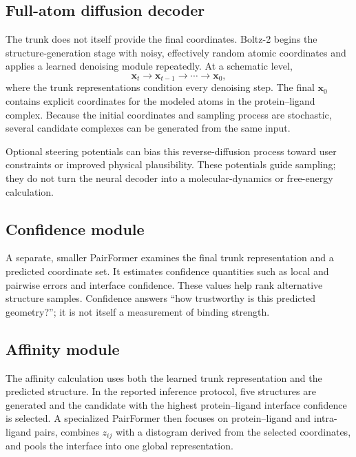 \subsection{Full-atom diffusion decoder}

The trunk does not itself provide the final coordinates. Boltz-2 begins the
structure-generation stage with noisy, effectively random atomic coordinates
and applies a learned denoising module repeatedly. At a schematic level,
\[
  \mathbf{x}_{t}
  \longrightarrow
  \mathbf{x}_{t-1}
  \longrightarrow \cdots \longrightarrow
  \mathbf{x}_{0},
\]
where the trunk representations condition every denoising step. The final
$\mathbf{x}_0$ contains explicit coordinates for the modeled atoms in the
protein--ligand complex. Because the initial coordinates and sampling process
are stochastic, several candidate complexes can be generated from the same
input.

Optional steering potentials can bias this reverse-diffusion process toward
user constraints or improved physical plausibility. These potentials guide
sampling; they do not turn the neural decoder into a molecular-dynamics or
free-energy calculation.

\subsection{Confidence module}

A separate, smaller PairFormer examines the final trunk representation and a
predicted coordinate set. It estimates confidence quantities such as local and
pairwise errors and interface confidence. These values help rank alternative
structure samples. Confidence answers ``how trustworthy is this predicted
geometry?''; it is not itself a measurement of binding strength.

\subsection{Affinity module}

The affinity calculation uses both the learned trunk representation and the
predicted structure. In the reported inference protocol, five structures are
generated and the candidate with the highest protein--ligand interface
confidence is selected. A specialized PairFormer then focuses on
protein--ligand and intra-ligand pairs, combines $z_{ij}$ with a distogram
derived from the selected coordinates, and pools the interface into one global
representation.

